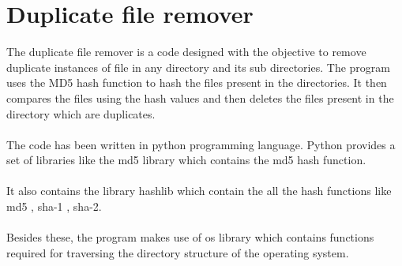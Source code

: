 \chapter{Duplicate file remover}

The duplicate file remover is a code designed with the objective to remove duplicate instances of file in any directory and its sub directories. The program uses the MD5 hash function to hash the files present in the directories. It then compares the files using the hash values and then deletes the files present in the directory which are duplicates. 
\\~\\
The code has been written in python programming language. Python provides a set of libraries like the md5 library which contains the md5 hash function.  
\\~\\It also contains the library hashlib which contain the all the hash functions like md5 , sha-1 , sha-2.
\\~\\Besides these, the program makes use of os library which contains functions required for traversing the directory structure of the operating system. 


